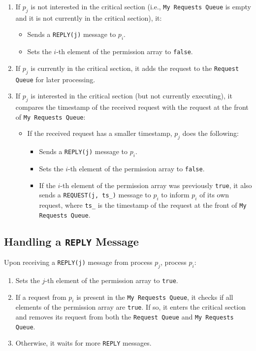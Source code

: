 \begin{enumerate}
    \item If \( p_j \) is not interested in the critical section (i.e., \texttt{My Requests Queue} is empty and it is not currently in the critical section), it:
    \begin{itemize}
        \item Sends a \texttt{REPLY(j)} message to \( p_i \).
        \item Sets the \( i \)-th element of the permission array to \texttt{false}.
    \end{itemize}
    
    \item If \( p_j \) is currently in the critical section, it adds the request to the \texttt{Request Queue} for later processing.
    
    \item If \( p_j \) is interested in the critical section (but not currently executing), it compares the timestamp of the received request with the request at the front of \texttt{My Requests Queue}:
    \begin{itemize}
        \item If the received request has a smaller timestamp, \( p_j \) does the following:
        \begin{itemize}
            \item Sends a \texttt{REPLY(j)} message to \( p_i \).
            \item Sets the \( i \)-th element of the permission array to \texttt{false}.
            \item If the \( i \)-th element of the permission array was previously \texttt{true}, it also sends a \texttt{REQUEST(j, ts\_{})} message to \( p_i \) to inform \( p_i \) of its own request, where \texttt{ts\_{}} is the timestamp of the request at the front of \texttt{My Requests Queue}.
        \end{itemize}
    \end{itemize}
\end{enumerate}


\subsection{Handling a \texttt{REPLY} Message} \label{prob5:reply}
Upon receiving a \texttt{REPLY(j)} message from process \( p_j \), process \( p_i \):
\begin{enumerate}
    \item Sets the \( j \)-th element of the permission array to \texttt{true}.
    \item If a request from \(p_i\) is present in the \texttt{My Requests Queue}, it checks if all elements of the permission array are \texttt{true}. If so, it enters the critical section and removes its request from both the \texttt{Request Queue} and \texttt{My Requests Queue}.
    \item Otherwise, it waits for more \texttt{REPLY} messages.
\end{enumerate}

